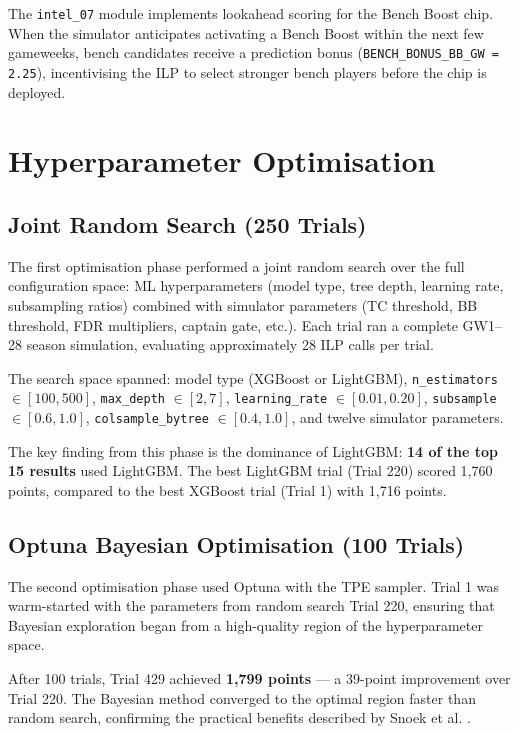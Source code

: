 The \texttt{intel\_07} module implements lookahead scoring for the Bench Boost chip. When the simulator anticipates activating a Bench Boost within the next few gameweeks, bench candidates receive a prediction bonus (\texttt{BENCH\_BONUS\_BB\_GW = 2.25}), incentivising the ILP to select stronger bench players before the chip is deployed.

\section{Hyperparameter Optimisation}

\subsection{Joint Random Search (250 Trials)}

The first optimisation phase performed a joint random search over the full configuration space: ML hyperparameters (model type, tree depth, learning rate, subsampling ratios) combined with simulator parameters (TC threshold, BB threshold, FDR multipliers, captain gate, etc.). Each trial ran a complete GW1--28 season simulation, evaluating approximately 28 ILP calls per trial.

The search space spanned: model type (XGBoost or LightGBM), \texttt{n\_estimators} $\in [100, 500]$, \texttt{max\_depth} $\in [2, 7]$, \texttt{learning\_rate} $\in [0.01, 0.20]$, \texttt{subsample} $\in [0.6, 1.0]$, \texttt{colsample\_bytree} $\in [0.4, 1.0]$, and twelve simulator parameters.

The key finding from this phase is the dominance of LightGBM: \textbf{14 of the top 15 results} used LightGBM. The best LightGBM trial (Trial 220) scored 1,760 points, compared to the best XGBoost trial (Trial 1) with 1,716 points.

\subsection{Optuna Bayesian Optimisation (100 Trials)}

The second optimisation phase used Optuna \cite{akiba2019optuna} with the TPE sampler. Trial 1 was warm-started with the parameters from random search Trial 220, ensuring that Bayesian exploration began from a high-quality region of the hyperparameter space.

After 100 trials, Trial 429 achieved \textbf{1,799 points} — a 39-point improvement over Trial 220. The Bayesian method converged to the optimal region faster than random search, confirming the practical benefits described by Snoek et al. \cite{snoek2012practical}.

